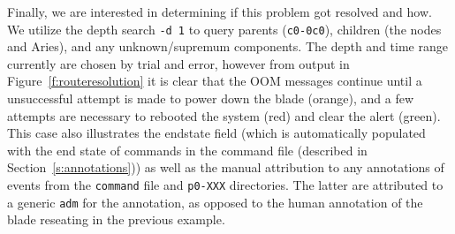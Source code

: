 Finally, we are interested in determining if this problem got resolved and how. We utilize the depth search
\texttt{-d 1} to query parents (\texttt{c0-0c0}), children (the nodes and Aries), and any unknown/supremum components.
The depth and time range currently
are chosen by trial and error, however from output in Figure~\ref{f:routeresolution} it is clear that the OOM messages continue until a unsuccessful attempt is made to power
down the blade (orange), and a few attempts are necessary to rebooted the system (red) and clear the alert (green). This case also illustrates
the endstate field (which is automatically populated with the end state of commands in the command file (described in Section~\ref{s:annotations}))
as well as the manual attribution to any annotations of events from the \texttt{command} file and \texttt{p0-XXX} directories. The latter are
attributed to a generic \texttt{adm} for the annotation, as opposed to the human annotation of the blade reseating in the previous example.

